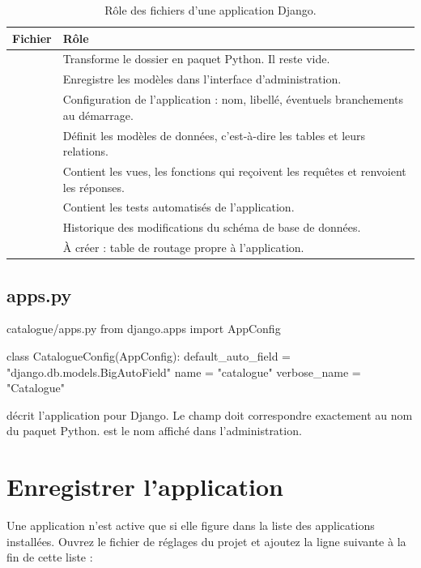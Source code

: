 \begin{table}[htbp]
\centering
\small
\begin{tabularx}{\textwidth}{L{3.6cm} X}
\toprule
\textbf{Fichier} & \textbf{Rôle} \\
\midrule
{} & Transforme le dossier en paquet Python. Il reste vide. \\
 & Enregistre les modèles dans l'interface d'administration. \\
 & Configuration de l'application : nom, libellé, éventuels
branchements au démarrage. \\
 & Définit les modèles de données, c'est-à-dire les tables et
leurs relations. \\
 & Contient les vues, les fonctions qui reçoivent les requêtes et
renvoient les réponses. \\
 & Contient les tests automatisés de l'application. \\
 & Historique des modifications du schéma de base de données. \\
 & À créer : table de routage propre à l'application. \\
\bottomrule
\end{tabularx}
\caption{Rôle des fichiers d'une application Django.}
\end{table}

\subsection{apps.py}

\begin{codebox}[python]{catalogue/apps.py}
from django.apps import AppConfig


class CatalogueConfig(AppConfig):
    default_auto_field = "django.db.models.BigAutoField"
    name = "catalogue"
    verbose_name = "Catalogue"
\end{codebox}

 décrit l'application pour Django. Le champ  doit
correspondre exactement au nom du paquet Python.  est le nom
affiché dans l'administration.

\section{Enregistrer l'application}

Une application n'est active que si elle figure dans la liste des applications
installées. Ouvrez le fichier de réglages du projet et ajoutez la ligne suivante
à la fin de cette liste :

